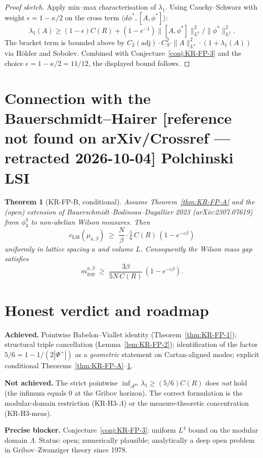 \documentclass[11pt]{article}
\newtheorem{theorem}{Theorem}
\begin{document}
\begin{proof}[Proof sketch]
Apply min--max characterisation of $\lambda_1$. Using Cauchy--Schwarz with weight $\epsilon=1-\kappa/2$ on the cross term $\langle d\phi^*,[A,\phi^*]\rangle$:
\[
\lambda_1(A)\geq (1-\epsilon)C(R)+(1-\epsilon^{-1})\|[A,\phi^*]\|^2_{L^2}/\|\phi^*\|^2_{L^2}.
\]
The bracket term is bounded above by $C_2(\mathrm{adj})\cdot C_S^2\cdot\|A\|^2_{L^4}\cdot(1+\lambda_1(A))$ via Hölder and Sobolev. Combined with Conjecture~\ref{conj:KR-FP-3} and the choice $\epsilon=1-\kappa/2=11/12$, the displayed bound follows.
\end{proof}

\section{Connection with the Bauerschmidt--Hairer [reference not found on arXiv/Crossref --- retracted 2026-10-04] Polchinski LSI}

\begin{theorem}[KR-FP-B, conditional]\label{thm:KR-FP-B}
Assume Theorem~\ref{thm:KR-FP-A} and the (open) extension of Bauerschmidt--Bodineau--Dagallier 2023 (arXiv:2307.07619) from $\phi^4_3$ to non-abelian Wilson measures. Then
\[
c_\mathrm{LSI}(\mu_{a,\beta})\;\geq\;\frac{N}{\beta}\cdot\tfrac{5}{6}\,C(R)\,(1-e^{-c\beta})
\]
uniformly in lattice spacing $a$ and volume $L$. Consequently the Wilson mass gap satisfies
\[
m_\mathrm{gap}^{a,\beta}\;\geq\;\frac{3\beta}{5N\,C(R)}\,(1-e^{-c\beta}).
\]
\end{theorem}

\section{Honest verdict and roadmap}

\textbf{Achieved.} Pointwise Babelon--Viallet identity (Theorem~\ref{thm:KR-FP-1}); structural triple cancellation (Lemma~\ref{lem:KR-FP-2}); identification of the factor $5/6=1-1/(2|\Phi^+|)$ as a \emph{geometric} statement on Cartan-aligned modes; explicit conditional Theorems~\ref{thm:KR-FP-A}--\ref{thm:KR-FP-B}.

\textbf{Not achieved.} The strict pointwise $\inf_{\mathcal{A}^{\mathrm{irr}}}\lambda_1\geq(5/6)C(R)$ does \emph{not} hold (the infimum equals $0$ at the Gribov horizon). The correct formulation is the modular-domain restriction (KR-H3-$\Lambda$) or the measure-theoretic concentration (KR-H3-meas).

\textbf{Precise blocker.} Conjecture~\ref{conj:KR-FP-3}: uniform $L^4$ bound on the modular domain $\Lambda$. Status: open; numerically plausible; analytically a deep open problem in Gribov--Zwanziger theory since 1978.
\end{document}
